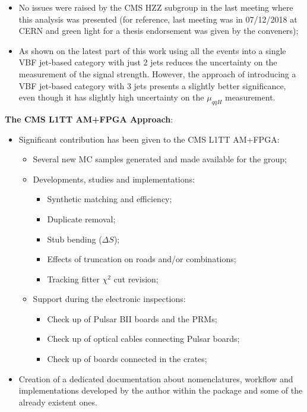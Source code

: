 \begin{itemize}
	\item No issues were raised by the CMS HZZ subgroup in the last meeting where this analysis was presented (for reference, last meeting was in 07/12/2018 at CERN and green light for a thesis endorsement was given by the conveners);
	\item As shown on the latest part of this work using all the events into a single VBF jet-based category with just 2 jets reduces the uncertainty on the measurement of the signal strength. However, the approach of introducing a VBF jet-based category with 3 jets presents a slightly better significance, even though it has slightly high uncertainty on the $\mu_{qqH}$ measurement.
\end{itemize}

{\flushleft \textbf{The CMS L1TT AM+FPGA Approach}:}
\begin{itemize}
	\item Significant contribution has been given to the CMS L1TT AM+FPGA:
	\begin{itemize}
		\item Several new MC samples generated and made available for the group;
		\item Developments, studies and implementations:
		\begin{itemize}
			\item Synthetic matching and efficiency;
			\item Duplicate removal;
			\item Stub bending ($\Delta S$);
			\item Effects of truncation on roads and/or combinations;
			\item Tracking fitter $\chi^{2}$ cut revision;
		\end{itemize}
		\item Support during the electronic inspections:
		\begin{itemize}
			\item Check up of Pulsar BII boards and the PRMs;
			\item Check up of optical cables connecting Pulsar boards;
			\item Check up of boards connected in the crates;
		\end{itemize}
	\end{itemize}
\end{itemize}
\begin{itemize}
	\item Creation of a dedicated documentation about nomenclatures, workflow and implementations developed by the author within the package and some of the already existent ones.
\end{itemize}

